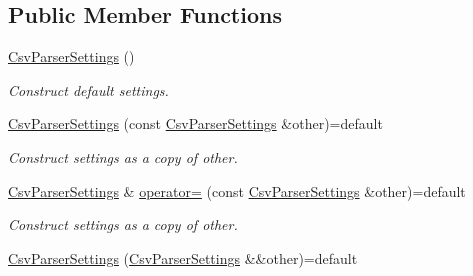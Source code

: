 \subsection*{Public Member Functions}
\begin{DoxyCompactItemize}
\item 
\hyperlink{class_mdt_1_1_plain_text_1_1_csv_parser_settings_a478e33bc5b599b9f37e51e7932ca7089}{Csv\+Parser\+Settings} ()\hypertarget{class_mdt_1_1_plain_text_1_1_csv_parser_settings_a478e33bc5b599b9f37e51e7932ca7089}{}\label{class_mdt_1_1_plain_text_1_1_csv_parser_settings_a478e33bc5b599b9f37e51e7932ca7089}

\begin{DoxyCompactList}\small\item\em Construct default settings. \end{DoxyCompactList}\item 
\hyperlink{class_mdt_1_1_plain_text_1_1_csv_parser_settings_a13d6b4aa193caa6626577eaebac51028}{Csv\+Parser\+Settings} (const \hyperlink{class_mdt_1_1_plain_text_1_1_csv_parser_settings}{Csv\+Parser\+Settings} \&other)=default\hypertarget{class_mdt_1_1_plain_text_1_1_csv_parser_settings_a13d6b4aa193caa6626577eaebac51028}{}\label{class_mdt_1_1_plain_text_1_1_csv_parser_settings_a13d6b4aa193caa6626577eaebac51028}

\begin{DoxyCompactList}\small\item\em Construct settings as a copy of {\itshape other}. \end{DoxyCompactList}\item 
\hyperlink{class_mdt_1_1_plain_text_1_1_csv_parser_settings}{Csv\+Parser\+Settings} \& \hyperlink{class_mdt_1_1_plain_text_1_1_csv_parser_settings_a6755c057e7d04afb0cab6bcaa3ffb652}{operator=} (const \hyperlink{class_mdt_1_1_plain_text_1_1_csv_parser_settings}{Csv\+Parser\+Settings} \&other)=default\hypertarget{class_mdt_1_1_plain_text_1_1_csv_parser_settings_a6755c057e7d04afb0cab6bcaa3ffb652}{}\label{class_mdt_1_1_plain_text_1_1_csv_parser_settings_a6755c057e7d04afb0cab6bcaa3ffb652}

\begin{DoxyCompactList}\small\item\em Construct settings as a copy of {\itshape other}. \end{DoxyCompactList}\item 
\hyperlink{class_mdt_1_1_plain_text_1_1_csv_parser_settings_a88ebdf75dc028676bda13c37a437aad2}{Csv\+Parser\+Settings} (\hyperlink{class_mdt_1_1_plain_text_1_1_csv_parser_settings}{Csv\+Parser\+Settings} \&\&other)=default\hypertarget{class_mdt_1_1_plain_text_1_1_csv_parser_settings_a88ebdf75dc028676bda13c37a437aad2}{}\label{class_mdt_1_1_plain_text_1_1_csv_parser_settings_a88ebdf75dc028676bda13c37a437aad2}


\end{DoxyCompactItemize}
